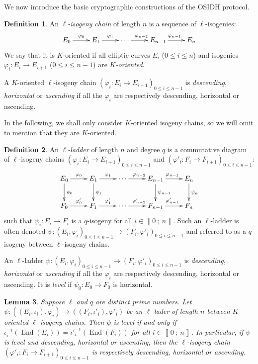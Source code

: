 \documentclass[a4paper,10pt]{report}
\theoremstyle{definition}
\newtheorem{definition}{Definition}[chapter]
\theoremstyle{plain}
\newtheorem{lemma}[definition]{Lemma}
\theoremstyle{definition}
\renewcommand{\i}[2]{\left\llbracket #1~;~#2\right\rrbracket}
\renewcommand{\(}{\left(}
\renewcommand{\)}{\right)}
\DeclareMathOperator{\End}{End}
\begin{document}
We now introduce the basic cryptographic constructions of the OSIDH protocol.

\begin{definition}
An \emph{$\ell$-isogeny chain} of length $n$ is a sequence of $\ell$-isogenies:
\[\xymatrix{
E_0 \ar[r]^{\varphi_0} & E_1 \ar[r]^{\varphi_{1}}& \cdots \ar[r]^{\varphi_{n-2}} & E_{n-1} \ar[r]^{\varphi_{n-1}} & E_n
}\]
We say that it is $K$-oriented if all elliptic curves $E_i$ ($0\leq i\leq n$) and isogenies $\varphi_i : E_i\longrightarrow E_{i+1}$ ($0\leq i\leq n-1$) are \emph{$K$-oriented}.

A $K$-oriented $\ell$-isogeny chain $(\varphi_i : E_i\longrightarrow E_{i+1})_{0\leq i\leq n-1}$ is \emph{descending}, \emph{horizontal} or \emph{ascending} if all the $\varphi_i$ are respectively descending, horizontal or ascending.
\end{definition}

In the following, we shall only consider $K$-oriented isogeny chains, so we will omit to mention that they are $K$-oriented.

\begin{definition}
An \emph{$\ell$-ladder} of length $n$ and degree $q$ is a commutative diagram of $\ell$-isogeny chains $(\varphi_i:E_i\longrightarrow E_{i+1})_{0\leq i\leq n-1}$ and $(\varphi'_i:F_i\longrightarrow F_{i+1})_{0\leq i\leq n-1}$:
\[\xymatrix{
E_0 \ar[d]^{\psi_0} \ar[r]^{\varphi_0} & E_1\ar[d]^{\psi_1} \ar[r]^{\varphi_{1}}& \cdots \ar[r]^{\varphi_{n-2}} & E_{n-1} \ar[d]^{\psi_{n-1}} \ar[r]^{\varphi_{n-1}} & E_n \ar[d]^{\psi_n}\\
F_0 \ar[r]^{\varphi'_0} & F_1 \ar[r]^{\varphi'_{1}}& \cdots \ar[r]^{\varphi'_{n-2}} & F_{n-1} \ar[r]^{\varphi'_{n-1}} & F_n
}\]
such that $\psi_i : E_i\longrightarrow F_i$ is a $q$-isogeny for all $i\in\i{0}{n}$. Such an $\ell$-ladder is often denoted $\psi : (E_i,\varphi_i)_{0\leq i\leq n-1}\longrightarrow (F_i,\varphi'_i)_{0\leq i\leq n-1}$ and referred to as a $q$-isogeny between $\ell$-isogeny chains. 

An $\ell$-ladder $\psi : (E_i,\varphi_i)_{0\leq i\leq n-1}\longrightarrow (F_i,\varphi'_i)_{0\leq i\leq n-1}$ is \emph{descending}, \emph{horizontal} or \emph{ascending} if all the $\varphi_i$ are respectively descending, horizontal or ascending.  It is \emph{level} if $\psi_0 : E_0\longrightarrow F_0$ is horizontal.
\end{definition}

\begin{lemma}\label{lemma 2}
Suppose $\ell$ and $q$ are distinct prime numbers. Let $\psi : ((E_i,\iota_i),\varphi_i)\longrightarrow ((F_i,\iota'_i),\varphi'_i)$ be an $\ell$-lader of length $n$ between  $K$-oriented $\ell$-isogeny chains. Then $\psi$ is level if and only if $\iota_i^{-1}(\End(E_i))={\iota'}_i^{-1}(\End(F_i))$ for all $i\in\i{0}{n}$. In particular,  if $\psi$ is level and descending, horizontal or ascending, then the $\ell$-isogeny chain $(\varphi'_i: F_i\longrightarrow F_{i+1})_{0\leq i\leq n-1}$ is respectively descending, horizontal or ascending.
\end{lemma}
\end{document}
